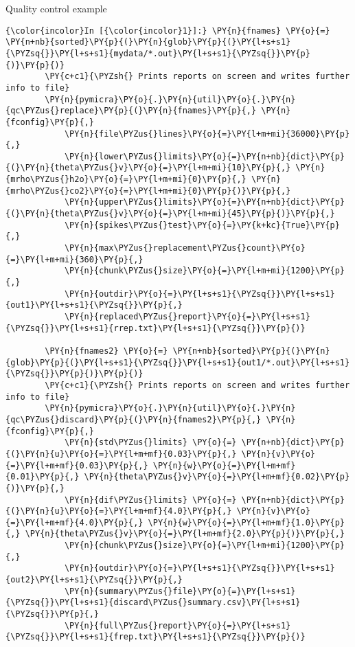 \begin{exampleblock}{Quality control example}
    \begin{Verbatim}[commandchars=\\\{\}]
{\color{incolor}In [{\color{incolor}1}]:} \PY{n}{fnames} \PY{o}{=} \PY{n+nb}{sorted}\PY{p}{(}\PY{n}{glob}\PY{p}{(}\PY{l+s+s1}{\PYZsq{}}\PY{l+s+s1}{mydata/*.out}\PY{l+s+s1}{\PYZsq{}}\PY{p}{)}\PY{p}{)}
        \PY{c+c1}{\PYZsh{} Prints reports on screen and writes further info to file}
        \PY{n}{pymicra}\PY{o}{.}\PY{n}{util}\PY{o}{.}\PY{n}{qc\PYZus{}replace}\PY{p}{(}\PY{n}{fnames}\PY{p}{,} \PY{n}{fconfig}\PY{p}{,}
            \PY{n}{file\PYZus{}lines}\PY{o}{=}\PY{l+m+mi}{36000}\PY{p}{,}
            \PY{n}{lower\PYZus{}limits}\PY{o}{=}\PY{n+nb}{dict}\PY{p}{(}\PY{n}{theta\PYZus{}v}\PY{o}{=}\PY{l+m+mi}{10}\PY{p}{,} \PY{n}{mrho\PYZus{}h2o}\PY{o}{=}\PY{l+m+mi}{0}\PY{p}{,} \PY{n}{mrho\PYZus{}co2}\PY{o}{=}\PY{l+m+mi}{0}\PY{p}{)}\PY{p}{,}
            \PY{n}{upper\PYZus{}limits}\PY{o}{=}\PY{n+nb}{dict}\PY{p}{(}\PY{n}{theta\PYZus{}v}\PY{o}{=}\PY{l+m+mi}{45}\PY{p}{)}\PY{p}{,}
            \PY{n}{spikes\PYZus{}test}\PY{o}{=}\PY{k+kc}{True}\PY{p}{,}
            \PY{n}{max\PYZus{}replacement\PYZus{}count}\PY{o}{=}\PY{l+m+mi}{360}\PY{p}{,}
            \PY{n}{chunk\PYZus{}size}\PY{o}{=}\PY{l+m+mi}{1200}\PY{p}{,}
            \PY{n}{outdir}\PY{o}{=}\PY{l+s+s1}{\PYZsq{}}\PY{l+s+s1}{out1}\PY{l+s+s1}{\PYZsq{}}\PY{p}{,}
            \PY{n}{replaced\PYZus{}report}\PY{o}{=}\PY{l+s+s1}{\PYZsq{}}\PY{l+s+s1}{rrep.txt}\PY{l+s+s1}{\PYZsq{}}\PY{p}{)}
        
        \PY{n}{fnames2} \PY{o}{=} \PY{n+nb}{sorted}\PY{p}{(}\PY{n}{glob}\PY{p}{(}\PY{l+s+s1}{\PYZsq{}}\PY{l+s+s1}{out1/*.out}\PY{l+s+s1}{\PYZsq{}}\PY{p}{)}\PY{p}{)}
        \PY{c+c1}{\PYZsh{} Prints reports on screen and writes further info to file}
        \PY{n}{pymicra}\PY{o}{.}\PY{n}{util}\PY{o}{.}\PY{n}{qc\PYZus{}discard}\PY{p}{(}\PY{n}{fnames2}\PY{p}{,} \PY{n}{fconfig}\PY{p}{,}
            \PY{n}{std\PYZus{}limits} \PY{o}{=} \PY{n+nb}{dict}\PY{p}{(}\PY{n}{u}\PY{o}{=}\PY{l+m+mf}{0.03}\PY{p}{,} \PY{n}{v}\PY{o}{=}\PY{l+m+mf}{0.03}\PY{p}{,} \PY{n}{w}\PY{o}{=}\PY{l+m+mf}{0.01}\PY{p}{,} \PY{n}{theta\PYZus{}v}\PY{o}{=}\PY{l+m+mf}{0.02}\PY{p}{)}\PY{p}{,}
            \PY{n}{dif\PYZus{}limits} \PY{o}{=} \PY{n+nb}{dict}\PY{p}{(}\PY{n}{u}\PY{o}{=}\PY{l+m+mf}{4.0}\PY{p}{,} \PY{n}{v}\PY{o}{=}\PY{l+m+mf}{4.0}\PY{p}{,} \PY{n}{w}\PY{o}{=}\PY{l+m+mf}{1.0}\PY{p}{,} \PY{n}{theta\PYZus{}v}\PY{o}{=}\PY{l+m+mf}{2.0}\PY{p}{)}\PY{p}{,}
            \PY{n}{chunk\PYZus{}size}\PY{o}{=}\PY{l+m+mi}{1200}\PY{p}{,}
            \PY{n}{outdir}\PY{o}{=}\PY{l+s+s1}{\PYZsq{}}\PY{l+s+s1}{out2}\PY{l+s+s1}{\PYZsq{}}\PY{p}{,}
            \PY{n}{summary\PYZus{}file}\PY{o}{=}\PY{l+s+s1}{\PYZsq{}}\PY{l+s+s1}{discard\PYZus{}summary.csv}\PY{l+s+s1}{\PYZsq{}}\PY{p}{,}
            \PY{n}{full\PYZus{}report}\PY{o}{=}\PY{l+s+s1}{\PYZsq{}}\PY{l+s+s1}{frep.txt}\PY{l+s+s1}{\PYZsq{}}\PY{p}{)}
\end{Verbatim}
\end{exampleblock}

